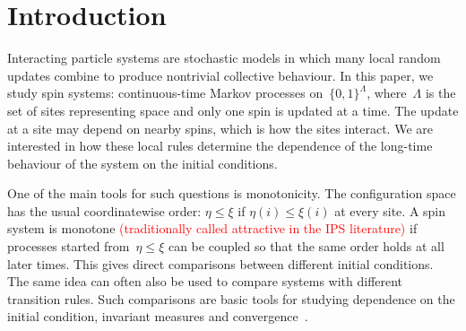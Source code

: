 \section{Introduction}
\label{sec:introduction}

%
%

Interacting particle systems are stochastic models in which many local random
updates combine to produce nontrivial collective behaviour. In this paper, we
study spin systems: continuous-time Markov processes on~$\{0,1\}^{\Lambda}$,
where~$\Lambda$ is the set of sites representing space and only one spin is
updated at a time. The update at a site may depend on nearby spins, which
is how the sites interact. We are interested in how these local rules determine
the dependence of the long-time behaviour of the system on the initial
conditions.


%
%
%
%

One of the main tools for such questions is monotonicity. The configuration
space has the usual coordinatewise order: $\eta\leq\xi$ if
$\eta(i)\leq\xi(i)$ at every site. A spin system is monotone\textcolor{red}{ (traditionally called attractive in
the IPS literature)} if processes started from~$\eta\leq\xi$ can be coupled so
that the same order holds at all later times. This gives direct comparisons between different initial
conditions. The same idea can often also be used to compare systems with
different transition rules. Such comparisons are basic tools for studying
dependence on the initial condition, invariant measures and
convergence\textcolor{red}{~\cite{Liggett1985,Harris1977}}.


